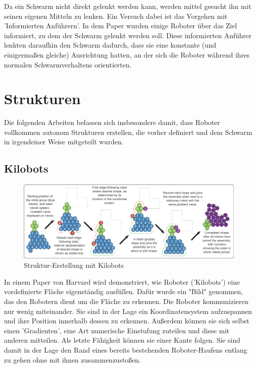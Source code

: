 Da ein Schwarm nicht direkt gelenkt werden kann, werden mittel gesucht ihn mit seinen eigenen Mitteln zu lenken. Ein Versuch dabei ist das Vorgehen mit 'Informierten Anführern'. In dem Paper wurden einige Roboter über das Ziel informiert, zu dem der Schwarm gelenkt werden soll. Diese informierten Anführer lenkten daraufhin den Schwarm dadurch, dass sie eine konstante (und einigermaßen gleiche) Ausrichtung hatten, an der sich die Roboter während ihres normalen Schwarmverhaltens orientierten.
\cite{RobotLeader}

\newpage\section{Strukturen}

Die folgenden Arbeiten befassen sich insbesondere damit, dass Roboter vollkommen autonom Strukturen erstellen, die vorher definiert und dem Schwarm in irgendeiner Weise mitgeteilt wurden.

\subsection*{Kilobots}

\begin{figure}
	\includegraphics[width=\pictureWidthBig,keepaspectratio]{graphics/Kilobot.png}
	\caption{Struktur-Erstellung mit Kilobots}
	\label{pic:Kilobot}
\end{figure}

In einem Paper von Harvard wird demonstriert, wie Roboter ('Kilobots') eine vordefinierte Fläche eigenständig ausfüllen. Dafür wurde ein "Bild" genommen, das den Robotern dient um die Fläche zu erkennen. Die Roboter kommunizieren nur wenig miteinander. Sie sind in der Lage ein Koordinatensystem aufzuspannen und ihre Position innerhalb dessen zu erkennen. Außerdem können sie sich selbst einen 'Gradienten', eine Art numerische Einstufung zuteilen und diese mit anderen mitteilen. Als letzte Fähigkeit können sie einer Kante folgen. Sie sind damit in der Lage den Rand eines bereits bestehenden Roboter-Haufens entlang zu gehen ohne mit ihnen zusammenzustoßen.


